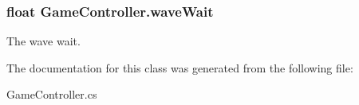 \hypertarget{classGameController_ad210270b367c1c439d35e8177d989019}{
\subsubsection[{wave\-Wait}]{\setlength{\rightskip}{0pt plus 5cm}float Game\-Controller.\-wave\-Wait}}\label{classGameController_ad210270b367c1c439d35e8177d989019}


The wave wait. 



The documentation for this class was generated from the following file\-:\begin{DoxyCompactItemize}
\item 
Game\-Controller.\-cs\end{DoxyCompactItemize}
